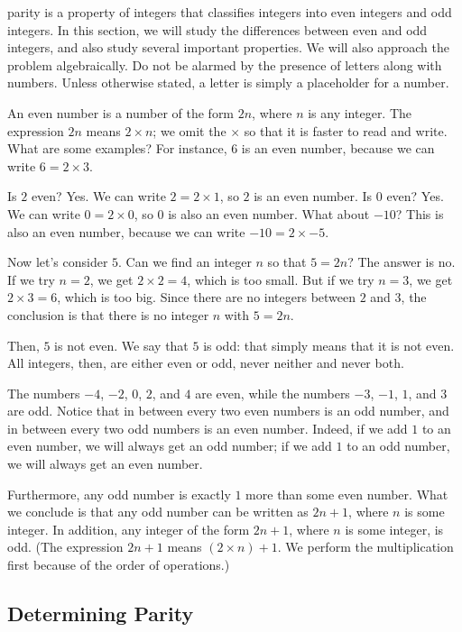 \documentclass[a4paper,10pt]{report}
\begin{document}
\Gls{parity} is a property of integers that classifies integers into even
integers and odd integers. In this section, we will study the differences
between even and odd integers, and also study several important properties. We
will also approach the problem algebraically. Do not be alarmed by the presence
of letters along with numbers. Unless otherwise stated, a letter is simply a
placeholder for a number.

An \gls{even} number is a number of the form \(2n\), where \(n\) is any
integer. The expression \(2n\) means \(2\times n\); we omit the \(\times\) so
that it is faster to read and write. What are some examples? For instance,
\(6\) is an even number, because we can write \(6 = 2 \times 3\).

Is \(2\) even? Yes. We can write \(2 = 2 \times 1\), so \(2\) is an even
number. Is \(0\) even? Yes. We can write \(0 = 2 \times 0\), so \(0\) is also
an even number. What about \(-10\)? This is also an even number, because we can
write \(-10 = 2 \times -5\).

Now let's consider \(5\). Can we find an integer \(n\) so that \(5 = 2n\)? The
answer is no. If we try \(n = 2\), we get \(2 \times 2 = 4\), which is too
small. But if we try \(n = 3\), we get \(2 \times 3 = 6\), which is too big.
Since there are no integers between \(2\) and \(3\), the conclusion is that
there is no integer \(n\) with \(5 = 2n\).

Then, \(5\) is not even. We say that \(5\) is \gls{odd}: that simply means that
it is not even. All integers, then, are either even or odd, never neither and
never both.

The numbers \(-4\), \(-2\), \(0\), \(2\), and \(4\) are even, while the numbers
\(-3\), \(-1\), \(1\), and \(3\) are odd. Notice that in between every two even
numbers is an odd number, and in between every two odd numbers is an even
number. Indeed, if we add \(1\) to an even number, we will always get an odd
number; if we add \(1\) to an odd number, we will always get an even number.

Furthermore, any odd number is exactly \(1\) more than some even number. What
we conclude is that any odd number can be written as \(2n+1\), where \(n\) is
some integer. In addition, any integer of the form \(2n+1\), where \(n\) is
some integer, is odd. (The expression \(2n+1\) means \((2\times n) + 1\). We
perform the multiplication first because of the order of operations.)

\subsection{Determining Parity}
\end{document}
